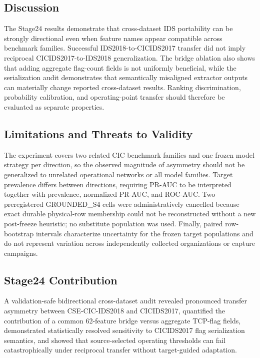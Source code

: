 \subsection{Discussion}

The Stage24 results demonstrate that cross-dataset IDS portability can be
strongly directional even when feature names appear compatible across benchmark
families. Successful IDS2018-to-CICIDS2017 transfer did not imply reciprocal
CICIDS2017-to-IDS2018 generalization. The bridge ablation also shows that adding
aggregate flag-count fields is not uniformly beneficial, while the serialization
audit demonstrates that semantically misaligned extractor outputs can
materially change reported cross-dataset results. Ranking discrimination,
probability calibration, and operating-point transfer should therefore be
evaluated as separate properties.

\subsection{Limitations and Threats to Validity}

The experiment covers two related CIC benchmark families and one frozen model
strategy per direction, so the observed magnitude of asymmetry should not be
generalized to unrelated operational networks or all model families. Target
prevalence differs between directions, requiring PR-AUC to be interpreted
together with prevalence, normalized PR-AUC, and ROC-AUC. Two preregistered
GROUNDED\_S4 cells were administratively cancelled because exact durable
physical-row membership could not be reconstructed without a new post-freeze
heuristic; no substitute population was used. Finally, paired row-bootstrap
intervals characterize uncertainty for the frozen target populations and do
not represent variation across independently collected organizations or
capture campaigns.

\subsection{Stage24 Contribution}

A validation-safe bidirectional cross-dataset audit revealed pronounced
transfer asymmetry between CSE-CIC-IDS2018 and CICIDS2017, quantified the
contribution of a common 62-feature bridge versus aggregate TCP-flag fields,
demonstrated statistically resolved sensitivity to CICIDS2017 flag
serialization semantics, and showed that source-selected operating thresholds
can fail catastrophically under reciprocal transfer without target-guided
adaptation.
